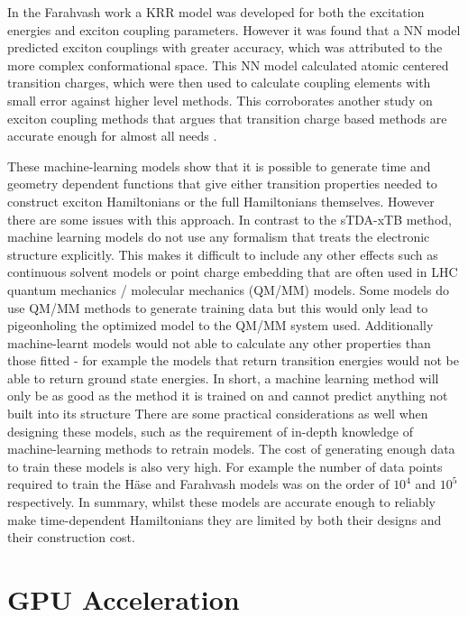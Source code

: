 In the Farahvash work a KRR model was developed for both the excitation energies
and exciton coupling parameters. However it was found that a NN model predicted 
exciton couplings with greater accuracy, which was attributed to the more complex 
conformational space. This NN model calculated atomic centered transition charges,
which were then used to calculate coupling elements with small error against higher 
level methods. This corroborates another study on exciton coupling methods that
argues that transition charge based methods are accurate enough for almost all needs \cite{Kenny2016}.

These machine-learning models show that it is possible to generate time and geometry
dependent functions that give either transition properties needed to construct exciton
Hamiltonians or the full Hamiltonians themselves. However there are some issues 
with this approach. In contrast to the sTDA-xTB method, machine learning models 
do not use any formalism that treats the electronic structure explicitly. This makes 
it difficult to include any other effects such as continuous solvent models or point
charge embedding that are often used in LHC quantum mechanics / molecular mechanics
(QM/MM) models. Some models do use QM/MM methods to generate training data but this
would only lead to pigeonholing the optimized model to the QM/MM system used. Additionally
machine-learnt models would not able to calculate any other properties than those 
fitted - for example the models that return \Qy transition energies would not be 
able to return ground state energies. In short, a machine learning method will only
be as good as the method it is trained on and cannot predict anything not built 
into its structure There are some practical considerations as well when designing 
these models, such as the requirement of in-depth knowledge of machine-learning methods 
to retrain models. The cost of generating enough data to train these models is also
very high. For example the number of data points required to train the H\"{a}se and
Farahvash models was on the order of $10^4$ and $10^5$ respectively. In summary,
whilst these models are accurate enough to reliably make time-dependent Hamiltonians 
they are limited by both their designs and their construction cost.

\section{GPU Acceleration}
\label{sec:gpu_acceleration}

